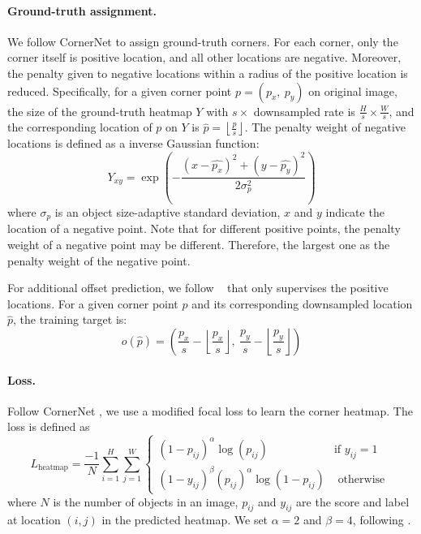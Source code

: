 \documentclass{article}
\begin{document}
\paragraph{Ground-truth assignment.} We follow CornerNet \cite{CornerNet} to assign ground-truth corners. For each corner, only the corner itself is positive location, and all other locations are negative. Moreover, the penalty given to negative locations within a radius of the positive location is reduced. Specifically, for a given corner point $p=(p_x,~p_y)$ on original image, the size of the ground-truth heatmap $Y$ with $s\times$ downsampled rate is  $\frac{H}{s}\times\frac{W}{s}$, and the corresponding location of $p$ on $Y$ is $\hat{p}=\left\lfloor \frac{p}{s} \right\rfloor$. The penalty weight of negative locations is defined as a inverse Gaussian function:
\begin{equation}
Y_{xy}=\exp{\left(-\frac{(x-\hat{p_x})^2+(y-\hat{p_y})^2}{2\sigma_p^2}\right)}
\end{equation}
where $\sigma_p$ is an object size-adaptive standard deviation, $x$ and $y$ indicate the location of a negative point. Note that for different positive points, the penalty weight of a negative point may be different. Therefore, the largest one as the penalty weight of the negative point.

For additional offset prediction, we follow ~\cite{CornerNet} that only supervises the positive locations. For a given corner point $p$ and its corresponding downsampled location $\hat{p}$, the training target is:
\begin{equation}
o(\hat{p})=\left(\frac{p_x}{s}-\left\lfloor \frac{p_x}{s} \right\rfloor,~ \frac{p_y}{s}-\left\lfloor \frac{p_y}{s} \right\rfloor\right)
\label{eq:off}
\end{equation}

\paragraph{Loss.} Follow CornerNet \cite{CornerNet}, we use a modified focal loss \cite{RetinaNet} to learn the corner heatmap. The loss is defined as
\begin{equation}
L_{\text {heatmap}}=\frac{-1}{N} \sum_{i=1}^{H} \sum_{j=1}^{W}\left\{\begin{array}{cc}
\left(1-p_{i j}\right)^{\alpha} \log \left(p_{i j}\right) & \text {if $y_{ij}=1$}\\
\left(1-y_{i j}\right)^{\beta}\left(p_{i j}\right)^{\alpha} \log \left(1-p_{i j}\right) & \text { otherwise }
\end{array}\right.    
\end{equation}
where $N$ is the number of objects in an image,  $p_{ij}$ and $y_{ij}$ are the score and label at location $(i, j)$ in the predicted heatmap. We set $\alpha=2$ and $\beta=4$, following \cite{CornerNet}.
\end{document}
